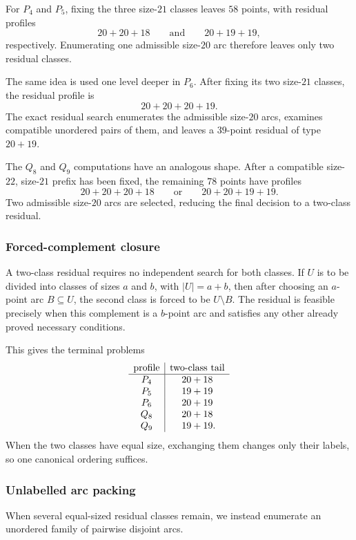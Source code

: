 \documentclass[11pt]{article}
\theoremstyle{definition}
\theoremstyle{remark}
\begin{document}
For \(P_4\) and \(P_5\), fixing the three size-\(21\) classes leaves \(58\)
points, with residual profiles
\[
  20+20+18
  \qquad\text{and}\qquad
  20+19+19,
\]
respectively.  Enumerating one admissible size-\(20\) arc therefore leaves
only two residual classes.

The same idea is used one level deeper in \(P_6\).  After fixing its two
size-\(21\) classes, the residual profile is
\[
  20+20+20+19.
\]
The exact residual search enumerates the admissible size-\(20\) arcs, examines
compatible unordered pairs of them, and leaves a \(39\)-point residual of
type \(20+19\).

The \(Q_8\) and \(Q_9\) computations have an analogous shape.
After a compatible size-\(22\), size-\(21\) prefix has been fixed, the
remaining \(78\) points have profiles
\[
  20+20+20+18
  \qquad\text{or}\qquad
  20+20+19+19.
\]
Two admissible size-\(20\) arcs are selected, reducing the final decision to
a two-class residual.

\subsubsection{Forced-complement closure}

A two-class residual requires no independent search for both classes.  If
\(U\) is to be divided into classes of sizes \(a\) and \(b\), with
\(|U|=a+b\), then after choosing an \(a\)-point arc \(B\subseteq U\), the
second class is forced to be \(U\setminus B\).  The residual is feasible
precisely when this complement is a \(b\)-point arc and satisfies any other
already proved necessary conditions.

This gives the terminal problems
\[
\begin{array}{c|c}
\text{profile} & \text{two-class tail}\\
\hline
P_4 & 20+18\\
P_5 & 19+19\\
P_6 & 20+19\\
Q_8 & 20+18\\
Q_9 & 19+19\rlap{.}
\end{array}
\]
When the two classes have equal size, exchanging them changes only their
labels, so one canonical ordering suffices.

\subsubsection{Unlabelled arc packing}

When several equal-sized residual classes remain, we instead enumerate an
unordered family of pairwise disjoint arcs.
\end{document}
